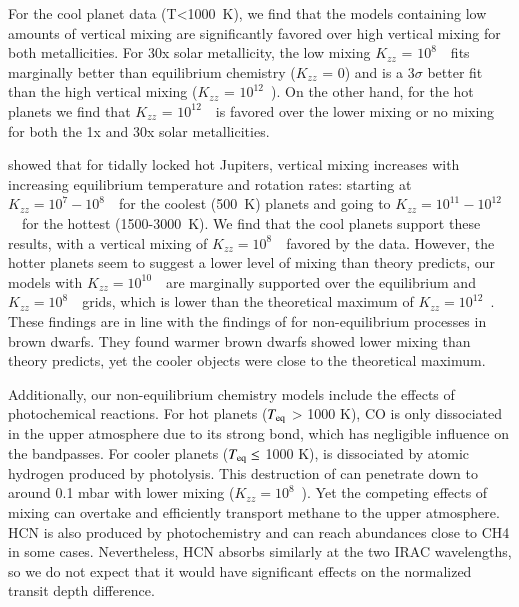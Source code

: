 For the cool planet data (T<1000~K), we find that the models containing low amounts of vertical mixing are significantly favored over high vertical mixing for both metallicities. For 30x solar metallicity, the low mixing $K_{zz}$ = $10^8$~\cmcms~fits marginally better than equilibrium chemistry ($K_{zz}$ = 0) and is a 3$\sigma$ better fit than the high vertical mixing ($K_{zz}$ = $10^{12}$~\cmcms). On the other hand, for the hot planets we find that $K_{zz}$ = $10^{12}$~\cmcms~is favored over the lower mixing or no mixing for both the 1x and 30x solar metallicities.

\citet{Komacek2019} showed that for tidally locked hot Jupiters, vertical mixing increases with increasing equilibrium temperature and rotation rates: starting at $K_{zz} = 10^{7}-10^{8}$~\cmcms~for the coolest (500~K) planets and going to $K_{zz} = 10^{11}-10^{12}$~\cmcms~for the hottest (1500-3000~K). We find that the cool planets support these results, with a vertical mixing of $K_{zz} = 10^{8}$~\cmcms~favored by the data. However, the hotter planets seem to suggest a lower level of mixing than theory predicts, our models with $K_{zz} = 10^{10}$~\cmcms~are marginally supported over the equilibrium and $K_{zz} = 10^{8}$~\cmcms~grids, which is lower than the theoretical maximum of $K_{zz} = 10^{12}$~\cmcms. These findings are in line with the findings of \citet{Miles2020} for non-equilibrium processes in brown dwarfs. They found warmer brown dwarfs showed lower mixing than theory predicts, yet the cooler objects were close to the theoretical maximum.

Additionally, our non-equilibrium chemistry models include the effects of photochemical reactions. For hot planets ($T_{\rm eq}$ > 1000 K), CO is only dissociated in the upper atmosphere due to its strong bond, which has negligible influence on the \spitzer bandpasses. For cooler planets ($T_{\rm eq} \leq$ 1000 K),  is dissociated by atomic hydrogen produced by photolysis. This destruction of  can penetrate down to around 0.1 mbar with lower mixing ($K_{zz}=10^{8}$~\cmcms). Yet the competing effects of mixing can overtake and efficiently transport methane to the upper atmosphere. HCN is also produced by photochemistry and can reach abundances close to CH4 in some cases. Nevertheless, HCN absorbs similarly at the two IRAC wavelengths, so we do not expect that it would have significant effects on the normalized transit depth difference.

